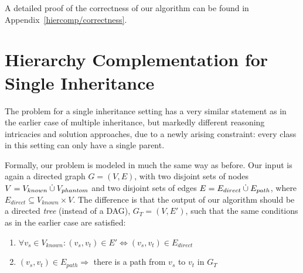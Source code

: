 
A detailed proof of the correctness of our algorithm can be found in
Appendix~\ref{hiercomp/correctness}.



\section{Hierarchy Complementation for Single Inheritance}
\label{hiercomp/sect/single}

The problem for a single inheritance setting has a very similar
statement as in the earlier case of multiple inheritance, but markedly
different reasoning intricacies and solution approaches, due to a newly
arising constraint: every class in this setting can only have a
single parent.

Formally, our problem is modeled in much the same way as before. Our
input is again a directed graph $G = (V,E)$, with two disjoint sets of
nodes $V = V_{known} \mathbin{\dot{\cup}} V_{phantom}$ and two disjoint sets of edges
$E = E_{direct} \mathbin{\dot{\cup}} E_{path}$, where $E_{direct} \subseteq V_{known}
\times V$.  The difference is that the output of our algorithm should
be a directed \emph{tree} (instead of a DAG), $G_T = (V,E')$, such
that the same conditions as in the earlier case are satisfied:
\begin{enumerate}
\item
  \(\forall v_s \in V_{known}: (v_s,v_t) \in E' \Leftrightarrow (v_s,
  v_t) \in E_{direct}\)
\item \((v_s,v_t) \in E_{path} \Rightarrow\) there is a path from
  \(v_s\) to \(v_t\) in \(G_T\)
\end{enumerate}

